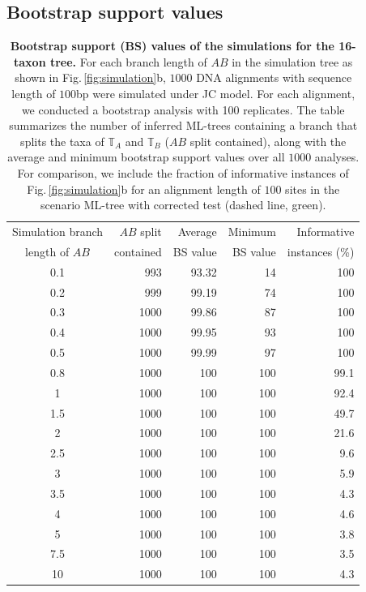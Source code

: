 \begin{appendices}
\subsection{Bootstrap support values}
\begin{table}[hb]
    \centering
    \begin{tabular}{|c|r|r|r|r|}
\hline
Simulation branch & $AB$ split & Average  & Minimum & Informative\\
length of $AB$& contained   & BS value & BS value & instances (\%) \\
\hline
0.1 &  993 &  93.32 &  14 & 100   \\
0.2 &  999 &  99.19 &  74 & 100  \\
0.3 & 1000 &  99.86 &  87 & 100   \\
0.4 & 1000 &  99.95 &  93 & 100 \\
0.5 & 1000 &  99.99 &  97 & 100   \\
0.8 & 1000 & 100  & 100 &  99.1 \\
1   & 1000 & 100  & 100 &  92.4 \\
1.5 & 1000 & 100  & 100 &  49.7 \\
2   & 1000 & 100  & 100 &  21.6 \\
2.5 & 1000 & 100  & 100 &   9.6 \\
3   & 1000 & 100  & 100 &   5.9 \\
3.5 & 1000 & 100  & 100 &   4.3 \\
4   & 1000 & 100  & 100 &   4.6 \\
5   & 1000 & 100  & 100 &   3.8 \\
7.5 & 1000 & 100  & 100 &   3.5 \\
10  & 1000 & 100  & 100 &   4.3 \\
\hline
    \end{tabular}
    \vspace{0.25cm}
    \caption{
        \textbf{Bootstrap support (BS) values of the simulations for the 16-taxon tree.} For each branch length of $AB$ in the simulation tree as shown in Fig.\,\ref{fig:simulation}b, $1000$ DNA alignments with sequence length of $100$bp were simulated under JC model. For each alignment, we conducted a bootstrap analysis with 100 replicates. The table summarizes the number of inferred ML-trees containing a branch that splits the taxa of $\mathbb{T}_A$ and $\mathbb{T}_B$ ($AB$ split contained), along with the average  and minimum bootstrap support values over all $1000$ analyses.  For comparison, we include the fraction of informative instances of Fig.\,\ref{fig:simulation}b for an alignment length of $100$ sites in the scenario ML-tree with corrected test (dashed line, {\color{MLtreeBonferroni} green}). 
    }
    \label{supptab:bootstrap}
    \end{table}


\end{appendices}
